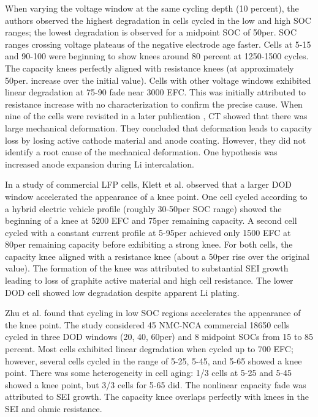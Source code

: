 \documentclass{article}
\begin{document}
When varying the voltage window at the same cycling depth (10 percent), the authors observed the highest degradation in cells cycled in the low and high SOC ranges; the lowest degradation is observed for a midpoint SOC of 50per. SOC ranges crossing voltage plateaus of the negative electrode age faster. Cells at 5-15 and 90-100 were beginning to show knees around 80 percent at 1250-1500 cycles. The capacity knees perfectly aligned with resistance knees (at approximately 50per. increase over the initial value). Cells with other voltage windows exhibited linear degradation at 75-90 fade near 3000 EFC. This was initially attributed to resistance increase with no characterization to confirm the precise cause. When nine of the cells were revisited in a later publication \cite{pfrang_long-term_2018}, CT showed that there was large mechanical deformation.  They concluded that deformation leads to capacity loss by losing active cathode material and anode coating. However, they did not identify a root cause of the mechanical deformation. One hypothesis was increased anode expansion during Li intercalation. 

In a study of commercial LFP cells, Klett et al. \cite{klett_non-uniform_2014} observed that a larger DOD window accelerated the appearance of a knee point. One cell cycled according to a hybrid electric vehicle profile (roughly 30-50per SOC range) showed the beginning of a knee at 5200 EFC and 75per remaining capacity. A second cell cycled with a constant current profile at 5-95per achieved only 1500 EFC at 80per remaining capacity before exhibiting a strong knee. For both cells, the capacity knee aligned with a resistance knee (about a 50per rise over the original value). The formation of the knee was attributed to substantial SEI growth leading to loss of graphite active material and high cell resistance. The lower DOD cell showed low degradation despite apparent Li plating. 

Zhu et al. \cite{zhu_investigation_2021} found that cycling in low SOC regions accelerates the appearance of the knee point. The study considered 45 NMC-NCA commercial 18650 cells cycled in three DOD windows (20, 40, 60per) and 8 midpoint SOCs from 15 to 85 percent. Most cells exhibited linear degradation when cycled up to 700 EFC; however, several cells cycled in the range of 5-25, 5-45, and 5-65 showed a knee point. There was some heterogeneity in cell aging: 1/3 cells at 5-25 and 5-45 showed a knee point, but 3/3 cells for 5-65 did. The nonlinear capacity fade was attributed to SEI growth. The capacity knee overlaps perfectly with knees in the SEI and ohmic resistance.
\end{document}
